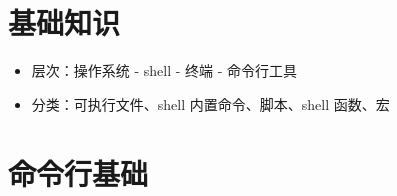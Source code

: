 \documentclass[
]{book}
\providecommand{\tightlist}{%
  \setlength{\itemsep}{0pt}\setlength{\parskip}{0pt}}
\begin{document}
\hypertarget{ux57faux7840ux77e5ux8bc6}{%
\section{基础知识}\label{ux57faux7840ux77e5ux8bc6}}

\begin{itemize}
\tightlist
\item
  层次：操作系统 - shell - 终端 - 命令行工具
\item
  分类：可执行文件、shell 内置命令、脚本、shell 函数、宏
\end{itemize}

\hypertarget{ux547dux4ee4ux884cux57faux7840}{%
\section{命令行基础}\label{ux547dux4ee4ux884cux57faux7840}}
\end{document}
